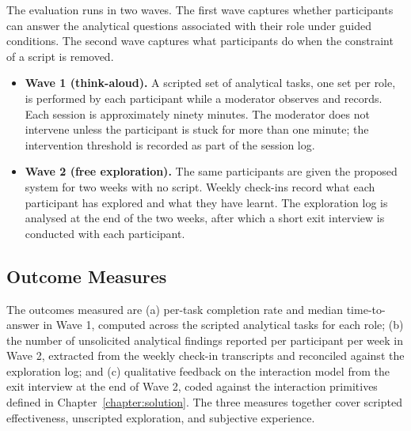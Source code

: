 The evaluation runs in two waves. The first wave captures whether
participants can answer the analytical questions associated with their
role under guided conditions. The second wave captures what participants do
when the constraint of a script is removed.

\begin{itemize}
  \item \textbf{Wave 1 (think-aloud).} A scripted set of analytical tasks,
        one set per role, is performed by each participant while a
        moderator observes and records. Each session is approximately
        ninety minutes. The moderator does not intervene unless the
        participant is stuck for more than one minute; the intervention
        threshold is recorded as part of the session log.
  \item \textbf{Wave 2 (free exploration).} The same participants are given
        the proposed system for two weeks with no script. Weekly check-ins
        record what each participant has explored and what they have
        learnt. The exploration log is analysed at the end of the two
        weeks, after which a short exit interview is conducted with each
        participant.
\end{itemize}

\subsection{Outcome Measures}
\label{sec:future:eval:outcomes}

The outcomes measured are (a) per-task completion rate and median
time-to-answer in Wave 1, computed across the scripted analytical tasks for
each role; (b) the number of unsolicited analytical findings reported per
participant per week in Wave 2, extracted from the weekly check-in
transcripts and reconciled against the exploration log; and (c) qualitative
feedback on the interaction model from the exit interview at the end of
Wave 2, coded against the interaction primitives defined in
Chapter~\ref{chapter:solution}. The three measures together cover scripted
effectiveness, unscripted exploration, and subjective experience.
